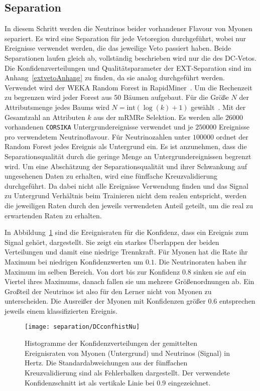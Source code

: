 \subsection{Separation}
\label{neutrinoseparation}
In diesem Schritt werden die Neutrinos beider vorhandener Flavour von Myonen separiert.  
Es wird eine Separation für jede Vetoregion durchgeführt, wobei nur Ereignisse verwendet werden, die das jeweilige Veto passiert haben.
Beide Separationen laufen gleich ab, vollständig beschrieben wird nur die des DC-Vetos.
Die Konfidenzverteilungen und Qualitätsparameter der EXT-Separation sind im Anhang~\ref{extvetoAnhang} zu finden, da sie analog durchgeführt werden.
Verwendet wird der WEKA Random Forest \cite{Weka2009} in RapidMiner~\cite{RapidMiner}.
Um die Rechenzeit zu begrenzen wird jeder Forest aus 50 Bäumen aufgebaut.
Für die Größe $N$ der Attributsmenge jedes Baums wird $N = \mathrm{int}(\log (k) +1 )$ gewählt~\cite{RandomForest}.
Mit der Gesamtzahl an Attributen $k$ aus der mRMRe Selektion.
Es werden alle $\num{26000}$ vorhandenen \texttt{CORSIKA} Untergrundereignisse verwendet und je $\num{250000}$ Ereignisse pro verwendetem Neutrinoflavour.
Für Neutrinozahlen unter $\num{100000}$ ordnet der Random Forest jedes Ereignis als Untergrund ein.
Es ist anzunehmen, dass die Separationsqualität durch die geringe Menge an Untergrundereignissen begrenzt wird.
Um eine Abschätzung der Separationsqualität und ihrer Schwankung auf ungesehenen Daten zu erhalten, wird eine fünffache Kreuzvalidierung durchgeführt.
Da dabei nicht alle Ereignisse Verwendung finden und das Signal zu Untergrund Verhältnis beim Trainieren nicht dem realen entspricht, werden die jeweiligen Raten durch den jeweils verwendeten Anteil geteilt, um die real zu erwartenden Raten zu erhalten. 


In Abbildung~\ref{fig:confidencenuvsmuDC} sind die Ereignisraten für die Konfidenz, dass ein Ereignis zum Signal gehört, dargestellt.
Sie zeigt ein starkes Überlappen der beiden Verteilungen und damit eine niedrige Trennkraft.
Für Myonen hat die Rate ihr Maximum bei niedrigen Konfidenzwerten um $\num{0.1}$.
Die Neutrinoraten haben ihr Maximum im selben Bereich. 
Von dort bis zur Konfidenz 0.8 sinken sie auf ein Viertel ihres Maximums, danach fallen sie um mehrere Größenordnungen ab.
Ein Großteil der Neutrinos ist also für den Lerner nicht von Myonen zu unterscheiden.
Die Ausreißer der Myonen mit Konfidenzen größer 0.6 entsprechen jeweils einem klassifizierten Ereignis. 
\begin{figure}
\begin{center}
    \texttt{[image: separation/DCconfhistNu]}
\end{center}
\vspace{-2em}
\caption{Histogramme der Konfidenzverteilungen der gemittelten Ereignisraten von Myonen (Untergrund) und Neutrinos (Signal) in Hertz. Die Standardabweichungen aus der fünffachen Kreuzvalidierung sind als Fehlerbalken dargestellt. Der verwendete Konfidenzschnitt ist als vertikale Linie bei 0.9 eingezeichnet.}
\label{fig:confidencenuvsmuDC}
\end{figure}

